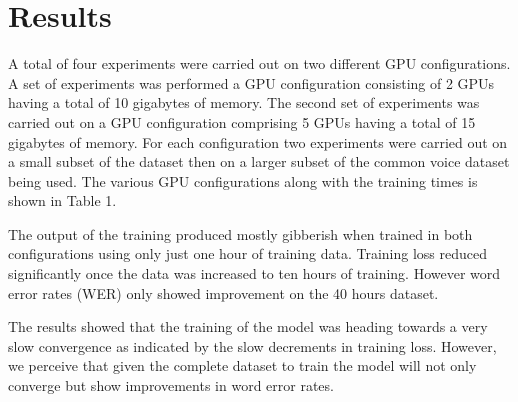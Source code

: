 \section{Results}
A total of four experiments were carried out on two different GPU configurations. A set of experiments was performed a GPU configuration consisting of 2 GPUs having a total of 10 gigabytes of memory. The second set of experiments was carried out on a GPU configuration comprising 5 GPUs having a total of 15 gigabytes of memory.  For each configuration two experiments were carried out on a small subset of the dataset then on a larger subset of the common voice dataset being used.   The various GPU configurations along with the training times is shown in Table 1.

The output of the training produced mostly gibberish when trained in both configurations using only just one hour of training data.  Training loss reduced significantly once the data was increased to ten hours of training.  However word error rates (WER) only showed improvement on the 40 hours dataset.

The results showed that the training of the model was heading towards a very slow convergence as indicated by the slow decrements in training loss.  However, we perceive that given the complete dataset to train the model will not only converge but show improvements in word error rates.

